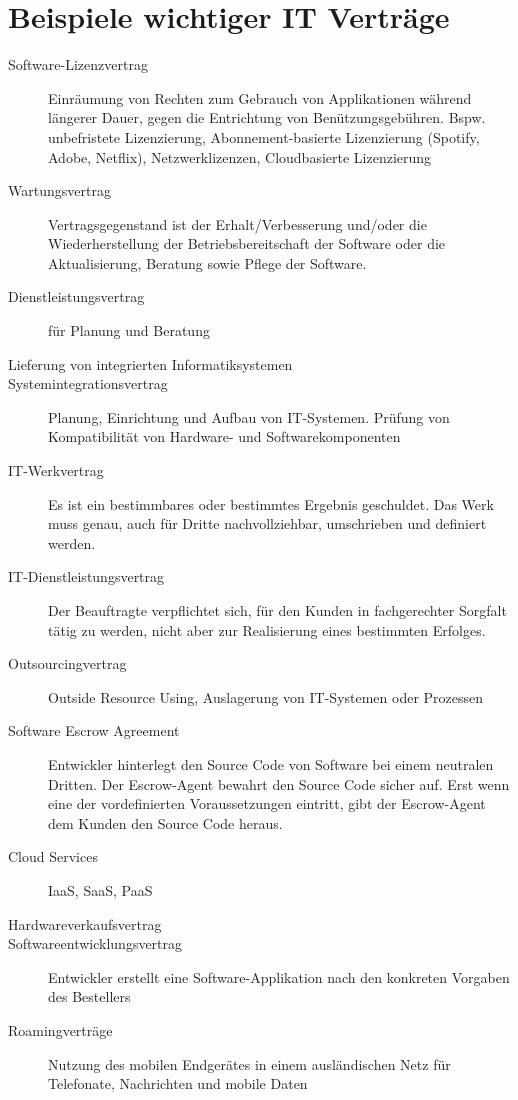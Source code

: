 \section{Beispiele wichtiger IT Verträge}

\begin{description}
  \item[Software-Lizenzvertrag] Einräumung von Rechten zum Gebrauch von Applikationen während längerer Dauer, gegen die Entrichtung von Benützungsgebühren. Bspw. unbefristete Lizenzierung, Abonnement-basierte Lizenzierung (Spotify, Adobe, Netflix), Netzwerklizenzen, Cloudbasierte Lizenzierung
  \item[Wartungsvertrag] Vertragsgegenstand ist der Erhalt/Verbesserung und/oder die Wiederherstellung der Betriebsbereitschaft der Software oder die Aktualisierung, Beratung sowie Pflege der Software.
  \item[Dienstleistungsvertrag] für Planung und Beratung  
  \item[Lieferung von integrierten Informatiksystemen]
  \item[Systemintegrationsvertrag] Planung, Einrichtung und Aufbau von IT-Systemen. Prüfung von Kompatibilität von Hardware- und Softwarekomponenten
  \item[IT-Werkvertrag] Es ist ein bestimmbares oder bestimmtes Ergebnis geschuldet. Das Werk muss genau, auch für Dritte nachvollziehbar, umschrieben und definiert werden.
  \item[IT-Dienstleistungsvertrag] Der Beauftragte verpflichtet sich, für den Kunden in fachgerechter Sorgfalt tätig zu werden, nicht aber zur Realisierung eines bestimmten Erfolges.
  \item[Outsourcingvertrag] Outside Resource Using, Auslagerung von IT-Systemen oder Prozessen
  \item[Software Escrow Agreement] Entwickler hinterlegt den Source Code von Software bei einem neutralen Dritten. Der Escrow-Agent bewahrt den Source Code sicher auf. Erst wenn eine der vordefinierten Voraussetzungen eintritt, gibt der Escrow-Agent dem Kunden den Source Code heraus.
  \item[Cloud Services] IaaS, SaaS, PaaS
  \item[Hardwareverkaufsvertrag]
  \item[Softwareentwicklungsvertrag] Entwickler erstellt eine Software-Applikation nach den konkreten Vorgaben des Bestellers
  \item[Roamingverträge] Nutzung des mobilen Endgerätes in einem ausländischen Netz für Telefonate, Nachrichten und mobile Daten

\end{description}
